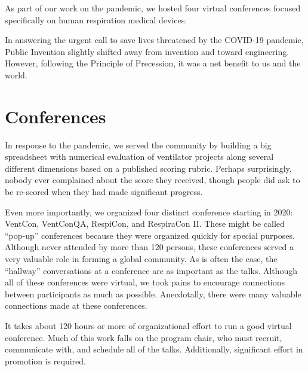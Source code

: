 \documentclass[
	fontsize=10pt, %
	twoside=false, %
	secnumdepth=1, %
]{kaobook}
\begin{document}
As part of our work on the pandemic, we hosted four virtual conferences
focused specifically on human respiration medical devices.

In answering the urgent call to save lives threatened by the COVID-19 pandemic,
Public Invention slightly shifted away from invention and toward engineering.
However, following the Principle of Precession, it was a net benefit
to us and the world.

\section{Conferences}

In response to the pandemic, we served the community by building a big spreadsheet
with numerical evaluation of ventilator projects along several different dimensions
based on a published scoring rubric.
Perhaps surprisingly, nobody ever complained about the score they received,
though people did ask to be re-scored when they had made significant progress.

Even more importantly, we organized four distinct conference starting in 2020:
VentCon, VentConQA, RespiCon, and RespiraCon II. These might be called ``pop-up''
conferences because they were organized quickly for special purposes. Although
never attended by more than 120 persons, these conferences served a very valuable
role in forming a global community. As is often the case, the ``hallway'' conversations
at a conference are as important as the talks. Although all of these conferences were
virtual, we took pains to encourage connections between participants as much as possible.
Anecdotally, there were many valuable connections made at these conferences.

It takes about 120 hours or more of organizational effort to run a good virtual conference.
Much of this work falls on the program chair, who must recruit, communicate with, and
schedule all of the talks.
Additionally, significant effort in promotion is required.
\end{document}
